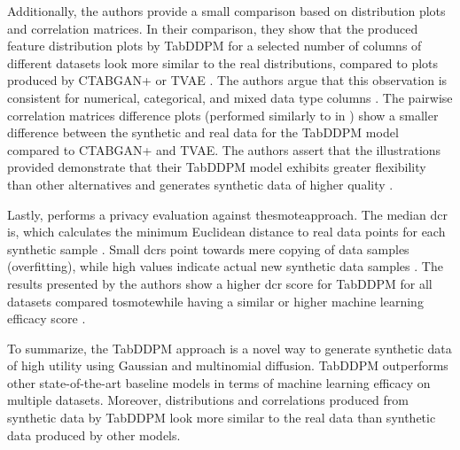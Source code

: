 Additionally, the authors provide a small comparison based on distribution plots and correlation matrices.
In their comparison, they show that the produced feature distribution plots by TabDDPM for a selected number of columns of different datasets look more similar 
to the real distributions, compared to plots produced by CTABGAN+ or TVAE \cite{kotelnikov2022TabDDPMModellingTabular}.
The authors argue that this observation is consistent for numerical, categorical, and mixed data type columns \cite{kotelnikov2022TabDDPMModellingTabular}.
The pairwise correlation matrices difference plots (performed similarly to in \cite{brenninkmeijer2019GenerationEvaluationTabular}) show a smaller difference between the synthetic and real data for the TabDDPM model compared to CTABGAN+ and TVAE.
The authors assert that the illustrations provided demonstrate that their TabDDPM model exhibits greater flexibility than other alternatives and generates synthetic data of higher quality \cite{kotelnikov2022TabDDPMModellingTabular}.

Lastly, \cite{kotelnikov2022TabDDPMModellingTabular} performs a privacy evaluation against the\gls{smote}approach.
The median \gls{dcr} is, which calculates the minimum Euclidean distance to real data points for each synthetic sample \cite{zhao2021CTABGANEffectiveTable}.
Small \glspl{dcr} point towards mere copying of data samples (overfitting), while high values indicate actual new synthetic data samples \cite{kotelnikov2022TabDDPMModellingTabular}.
The results presented by the authors show a higher \gls{dcr} score for TabDDPM for all datasets compared to\gls{smote}while having a similar or higher machine learning efficacy score \cite{kotelnikov2022TabDDPMModellingTabular}.

To summarize, the TabDDPM approach is a novel way to generate synthetic data of high utility using Gaussian and multinomial diffusion.
TabDDPM outperforms other state-of-the-art baseline models in terms of machine learning efficacy on multiple datasets.
Moreover, distributions and correlations produced from synthetic data by TabDDPM look more similar to the real data than synthetic data produced by other models.





